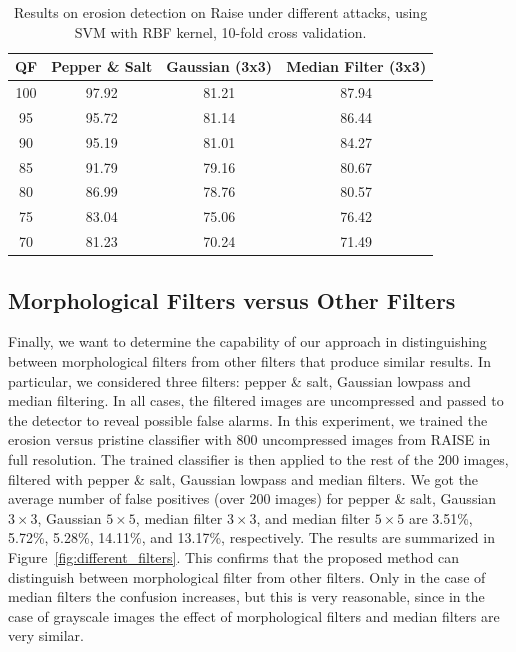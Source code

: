 \documentclass{ieeeaccess}
\begin{document}
\begin{table}[t!]
	\centering
	\caption{Results on erosion detection on Raise under different attacks, using SVM with RBF kernel, 10-fold cross validation.}
	\label{table:attacks2}
	\begin{tabular}{c|ccc}
		\hline\hline
		\textbf{QF} & \textbf{Pepper \& Salt}&\textbf{Gaussian (3x3)}&\textbf{Median Filter (3x3)}\\
		\hline
		100&97.92&81.21&87.94\\
		95&95.72&81.14&86.44\\
		90&95.19&81.01&84.27\\
		85&91.79&79.16&80.67\\
		80&86.99&78.76&80.57\\
		75&83.04&75.06&76.42\\
		70&81.23&70.24&71.49\\
		\hline\hline	
	\end{tabular}
\end{table}

\subsection{Morphological Filters versus Other Filters }
\label{subsec:results_different_filters}

Finally, we want to determine the capability of our approach in distinguishing between morphological filters from other filters that produce similar results. In particular, we considered three filters: pepper \& salt, Gaussian lowpass and median filtering. In all cases, the filtered images are uncompressed and passed to the detector to reveal possible false alarms. 
In this experiment, we trained the erosion versus pristine classifier with 800 uncompressed images from RAISE in full resolution. The trained classifier is then applied to the rest of the 200 images, filtered with pepper \& salt, Gaussian lowpass and median filters. We got the average number of false positives (over 200 images) for pepper \& salt, Gaussian $3 \times 3$, Gaussian $5 \times 5$, median filter $3 \times 3$, and median filter $5 \times 5$ are 3.51\%, 5.72\%, 5.28\%, 14.11\%, and 13.17\%, respectively. The results are summarized in Figure~\ref{fig:different_filters}.  
This confirms that the proposed method can distinguish between morphological filter from other filters. Only in the case of median filters the confusion increases, but this is very reasonable, since in the case of grayscale images the effect of morphological filters and median filters are very similar.
\end{document}
